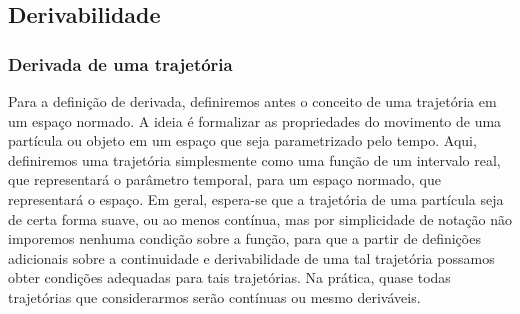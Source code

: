 \begin{comment}


\begin{proposition}
\label{prop:diferenciavel.propriedade}
Sejam $\bm E$ e $\bm E'$ espaços normados, $A \subseteq E$ um aberto, $x \in A$ e $\fun{f}{A}{E'}$ uma função diferenciável em $x$.
Se $\fun{\D f|_x}{E}{E'}$ é injetiva, então existem $\delta,c \in \R_{>0}$ tais que, para todos $x',x'' \in \bola{x}{\delta}$,
	\begin{equation*}
	\nor{f(x'') - f(x')} \geq c\nor{x''-x'}.
	\end{equation*}
Segue que $\fun{f|_{\bola{x}{\delta}}}{\bola{x}{\delta}}{f(\bola{x}{\delta})}$ é um homeomorfismo.
\end{proposition}

\begin{proposition}
\label{prop:fortemente.diferenciavel.propriedade}
Sejam $\bm E$ e $\bm E'$ espaços normados, $A \subseteq E$ um aberto, $x \in A$ e $\fun{f}{A}{E'}$ uma função fortemente diferenciável em $x$ tal que $\fun{\D f|_x}{E}{E'}$ é injetiva. Existem $\delta,c \in \R_{>0}$ tais que, para todos $x',x'' \in \bola{x}{\delta}$,
	\begin{equation*}
	\nor{f(x'') - f(x')} \geq c\nor{x''-x'}.
	\end{equation*}
Segue que $\fun{f|_{\bola{x}{\delta}}}{\bola{x}{\delta}}{f(\bola{x}{\delta})}$ é um homeomorfismo.
\end{proposition}
\begin{proof}
Da injetividade de $\D f|_x$ segue que existe $c \in \R_{>0}$ tal que, para todo $v \in E$,
	\begin{equation*}
	\nor{\D f|_x(v)} \geq 2c\nor{v}.
	\end{equation*}

\end{proof}


\end{comment}

\subsection{Derivabilidade}

\subsubsection{Derivada de uma trajetória}

Para a definição de derivada, definiremos antes o conceito de uma trajetória em um espaço normado. A ideia é formalizar as propriedades do movimento de uma partícula ou objeto em um espaço que seja parametrizado pelo tempo. Aqui, definiremos uma trajetória simplesmente como uma função de um intervalo real, que representará o parâmetro temporal, para um espaço normado, que representará o espaço. Em geral, espera-se que a trajetória de uma partícula seja de certa forma suave, ou ao menos contínua, mas por simplicidade de notação não imporemos nenhuma condição sobre a função, para que a partir de definições adicionais sobre a continuidade e derivabilidade de uma tal trajetória possamos obter condições adequadas para tais trajetórias. Na prática, quase todas trajetórias que considerarmos serão contínuas ou mesmo deriváveis.

